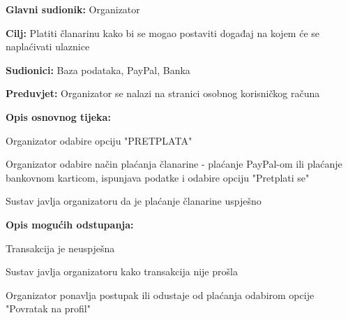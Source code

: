 					\noindent {}
\begin{packed_item}
	\item \textbf{Glavni sudionik:} Organizator
	\item  \textbf{Cilj:} Platiti članarinu kako bi se mogao postaviti događaj na kojem će se naplaćivati ulaznice
	\item  \textbf{Sudionici:} Baza podataka, PayPal, Banka
	\item  \textbf{Preduvjet:} Organizator se nalazi na stranici osobnog korisničkog računa
	\item  \textbf{Opis osnovnog tijeka:}
	
	\item[] \begin{packed_enum}
		\item Organizator odabire opciju "PRETPLATA"
		\item Organizator odabire način plaćanja članarine - plaćanje PayPal-om ili plaćanje bankovnom karticom, ispunjava podatke i odabire opciju "Pretplati se"
		\item Sustav javlja organizatoru da je plaćanje članarine uspješno
	\end{packed_enum}
	
		\item  \textbf{Opis mogućih odstupanja:}
	
	\item[] \begin{packed_item}
		
		\item[2.a] Transakcija je neuspješna
		\item[] \begin{packed_enum}
			
			\item Sustav javlja organizatoru kako transakcija nije prošla
			\item Organizator ponavlja postupak ili odustaje od plaćanja odabirom opcije "Povratak na profil"
			
		\end{packed_enum}
		
	\end{packed_item}
	
\end{packed_item}

